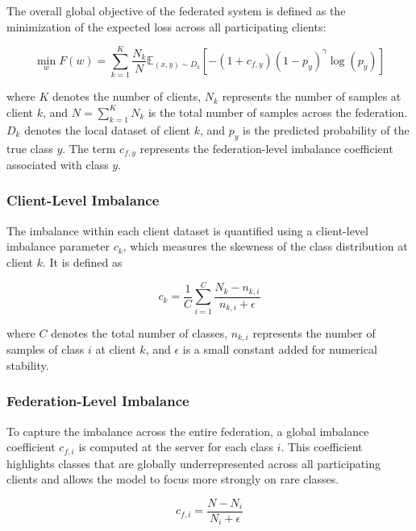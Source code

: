 \documentclass[12pt]{book}
\begin{document}
The overall global objective of the federated system is defined as the minimization of the expected loss across all participating clients:

\begin{equation}
\min_{w} F(w) =
\sum_{k=1}^{K} \frac{N_k}{N}
\mathbb{E}_{(x,y)\sim D_k}
\left[
-(1 + c_{f,y})(1 - p_y)^{\gamma} \log(p_y)
\right]
\end{equation}

where \(K\) denotes the number of clients, \(N_k\) represents the number of samples at client \(k\), and \(N = \sum_{k=1}^{K} N_k\) is the total number of samples across the federation. \(D_k\) denotes the local dataset of client \(k\), and \(p_y\) is the predicted probability of the true class \(y\). The term \(c_{f,y}\) represents the federation-level imbalance coefficient associated with class \(y\).

\subsubsection{Client-Level Imbalance}

The imbalance within each client dataset is quantified using a client-level imbalance parameter \(c_k\), which measures the skewness of the class distribution at client \(k\). It is defined as

\begin{equation}
c_k = \frac{1}{C} \sum_{i=1}^{C} \frac{N_k - n_{k,i}}{n_{k,i} + \epsilon}
\end{equation}

where \(C\) denotes the total number of classes, \(n_{k,i}\) represents the number of samples of class \(i\) at client \(k\), and \(\epsilon\) is a small constant added for numerical stability.

\subsubsection{Federation-Level Imbalance}

To capture the imbalance across the entire federation, a global imbalance coefficient \(c_{f,i}\) is computed at the server for each class \(i\). This coefficient highlights classes that are globally underrepresented across all participating clients and allows the model to focus more strongly on rare classes.

\begin{equation}
c_{f,i} = \frac{N - N_i}{N_i + \epsilon}
\end{equation}
\end{document}
